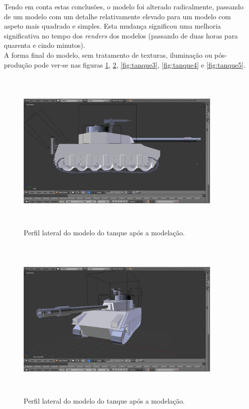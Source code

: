 Tendo em conta estas conclusões, o modelo foi alterado radicalmente, passando de um modelo com um detalhe relativamente elevado para um modelo com aspeto mais quadrado e simples. Esta mudança significou uma melhoria significativa no tempo dos \textit{renders} dos modelos (passando de duas horas para quarenta e cindo minutos). \\

A forma final do modelo, sem tratamento de texturas, iluminação ou pós-produção pode ver-se nas figuras \ref{fig:tanque1}, \ref{fig:tanque2}, \ref{fig:tanque3}, \ref{fig:tanque4} e \ref{fig:tanque5}.

\begin{figure}[!h]
  \includegraphics[width=10cm, height=8cm]{p1.png}
  \centering
  \caption{Perfil lateral do modelo do tanque após a modelação.}
  \label{fig:tanque1}
\end{figure}

\begin{figure}[!h]
  \includegraphics[width=10cm, height=8cm]{p2.png}
  \centering
  \caption{Perfil lateral do modelo do tanque após a modelação.}
  \label{fig:tanque2}
\end{figure}

